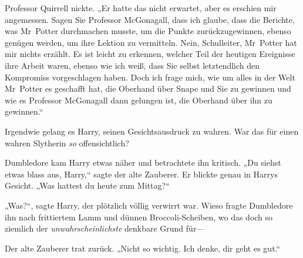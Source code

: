 Professor Quirrell nickte. „Er hatte das nicht erwartet, aber es erschien mir angemessen. Sagen Sie Professor McGonagall, dass ich glaube, dass die Berichte, was Mr~Potter durchmachen musste, um die Punkte zurückzugewinnen, ebenso genügen werden, um ihre Lektion zu vermitteln. Nein, Schulleiter, Mr~Potter hat mir nichts erzählt. Es ist leicht zu erkennen, welcher Teil der heutigen Ereignisse ihre Arbeit waren, ebenso wie ich weiß, dass Sie selbst letztendlich den Kompromiss vorgeschlagen haben. Doch ich frage mich, wie um alles in der Welt Mr~Potter es geschafft hat, die Oberhand über Snape und Sie zu gewinnen und wie es Professor McGonagall dann gelungen ist, die Oberhand über ihn zu gewinnen.“

Irgendwie gelang es Harry, seinen Gesichtsausdruck zu wahren. War das für einen wahren Slytherin \emph{so} offensichtlich?

Dumbledore kam Harry etwas näher und betrachtete ihn kritisch. „Du siehst etwas blass aus, Harry,“ sagte der alte Zauberer. Er blickte genau in Harrys Gesicht. „Was hattest du heute zum Mittag?“

„Was?“, sagte Harry, der plötzlich völlig verwirrt war. Wieso fragte Dumbledore ihn nach frittiertem Lamm und dünnen Broccoli-Scheiben, wo das doch so ziemlich der \emph{unwahrscheinlichste} denkbare Grund für—

Der alte Zauberer trat zurück. „Nicht so wichtig. Ich denke, dir geht es gut.“

